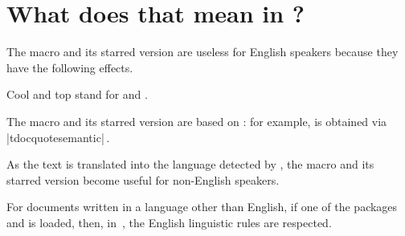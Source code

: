\documentclass{tutodoc}
\begin{document}
\section{What does that mean in ?}

The macro  and its starred version are useless for English speakers because they have the following effects.


\begin{tdoclatex}
Cool and top stand for  and .
\end{tdoclatex}


The macro  and its starred version are based on  : for example,  is obtained via \tdoclatexin|tdocquote{semantic}|\,.


\begin{tdocnote}
    As the text  is translated into the language detected by \thisproj, the macro  and its starred version become useful for non-English speakers.
\end{tdocnote}


\begin{tdocimp}	
	For documents written in a language other than English, if one of the packages  and  is loaded, then, in \,, the English linguistic rules are respected.
\end{tdocimp}
\end{document}
